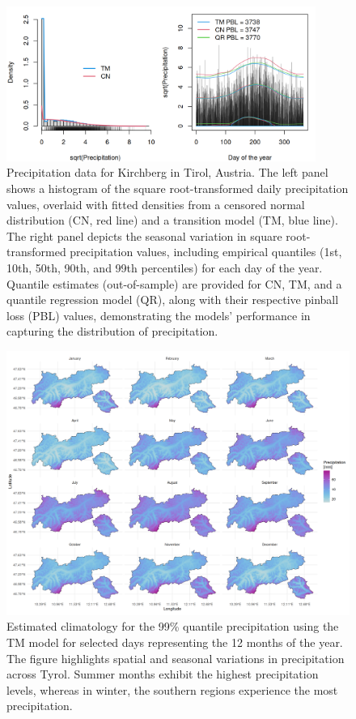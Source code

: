 \documentclass[english,a4paper,11pt]{article}
\begin{document}
\begin{figure}[!ht]
\centering
\includegraphics[width=0.9\textwidth]{ts_hist.png}
\caption{\label{fig:Kirchberg} Precipitation data for Kirchberg in Tirol, Austria.
  The left panel shows a histogram of the square root-transformed daily precipitation values,
  overlaid with fitted densities from a censored normal distribution (CN, red line) and
  a transition model (TM, blue line). The right panel depicts the seasonal variation in
  square root-transformed precipitation values, including empirical quantiles
  (1st, 10th, 50th, 90th, and 99th percentiles) for each day of the year.
  Quantile estimates (out-of-sample) are provided for CN, TM, and a quantile regression model (QR),
  along with their respective pinball loss (PBL) values, demonstrating the models' performance
  in capturing the distribution of precipitation.}
\end{figure}
\begin{figure}[!h]
\centering
\includegraphics[width=1\textwidth]{predictions.png}
\caption{\label{fig:clim} Estimated climatology for the 99\% quantile precipitation using
  the TM model for selected days representing the 12 months of the year. The figure
  highlights spatial and seasonal variations in precipitation across Tyrol. Summer
  months exhibit the highest precipitation levels, whereas in winter, the southern
  regions experience the most precipitation.}
\end{figure}
\end{document}
